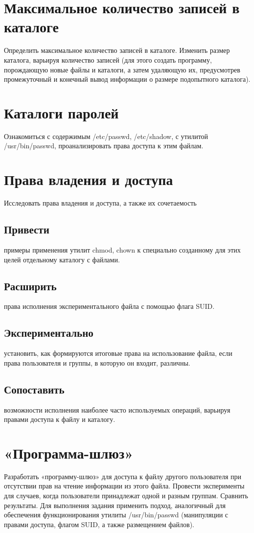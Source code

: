 \documentclass[a4paper]{article}
\begin{document}
\section{Максимальное количество записей в каталоге} Определить максимальное количество записей в каталоге. 
Изменить размер каталога, варьируя количество записей (для этого создать программу, порождающую новые файлы и каталоги, а затем удаляющую их, предусмотрев промежуточный и конечный вывод информации о размере подопытного каталога). 

\section{Каталоги паролей} Ознакомиться с содержимым /etc/passwd, /etc/shadow, с утилитой /usr/bin/passwd, проанализировать права доступа к этим файлам.

\section{Права владения и доступа} Исследовать права владения и доступа, а также их сочетаемость
\subsection{ Привести} примеры применения утилит chmod, chown к специально созданному для этих целей отдельному каталогу с файлами. 
\subsection{ Расширить} права исполнения экспериментального файла с помощью флага SUID. 
\subsection{ Экспериментально} установить, как формируются итоговые права на использование файла, если права пользователя и группы, в которую он входит, различны.
\subsection{ Сопоставить} возможности исполнения наиболее часто используемых операций, варьируя правами доступа к файлу и каталогу.

\section{«Программа-шлюз» } Разработать «программу-шлюз» для доступа к файлу другого пользователя при отсутствии прав на чтение информации из этого файла. Провести эксперименты для случаев, когда пользователи принадлежат одной и разным группам. Сравнить результаты. Для выполнения задания применить подход, аналогичный для обеспечения функционирования утилиты /usr/bin/passwd (манипуляции с правами доступа, флагом SUID, а также размещением файлов).
\end{document}
